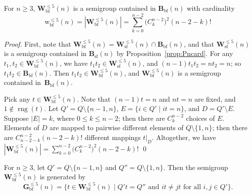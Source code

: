 \documentclass{llncs}
\renewcommand{\le}{\leqslant}
\renewcommand{\ge}{\geqslant}
\newcommand{\txt}[1]{\mbox{ #1 }}
\newcommand{\timg}{\mathop{\mbox{rng}}}
\newcommand{\Bsf}{\mathbf{B}_{\mathrm{sf}}}
\newcommand{\Bbf}{\mathbf{B}_{\mathrm{bf}}}
\newcommand{\Vsf}{\mathbf{W}^{\le 5}_{\mathrm{sf}}}
\newcommand{\Vbf}{\mathbf{W}^{\le 5}_{\mathrm{bf}}}
\newcommand{\Gbf}{\mathbf{G}^{\le 5}_{\mathrm{bf}}}
\newcommand{\vbf}{{\mathrm{w}^{\le 5}_{\mathrm{bf}}}}
\begin{document}
\begin{proposition}\label{prop:Vncard}
For $n \ge 3$, $\Vbf(n)$ is a semigroup contained in $\Bbf(n)$ with cardinality
\begin{equation*}
\vbf(n) = |\Vbf(n)| = \sum_{k=0}^{n-2} \big( C^{n-2}_k \big)^2 (n-2-k)!
\end{equation*}
\end{proposition}


\begin{proof}
First, note that $\Vbf(n) = \Vsf(n) \cap \Bbf(n)$, and that $\Vsf(n)$ is a semigroup contained in $\Bsf(n)$ by Proposition~\ref{prop:Pncard}. For any $t_1,t_2 \in \Vbf(n)$, we have $t_1t_2 \in \Vsf(n)$, and $(n-1)t_1t_2 = nt_2 = n$; so $t_1t_2 \in \Bbf(n)$. Then $t_1t_2 \in \Vbf(n)$, and $\Vbf(n)$ is a semigroup contained in~$\Bbf(n)$. 

Pick any $t \in \Vbf(n)$. Note that $(n-1)t = n$ and $nt = n$ are fixed, and $1 \not\in \timg(t)$. Let $Q' = Q \setminus \{n-1,n\}$, $E = \{i \in Q' \mid it = n\}$, and $D = Q' \setminus E$. Suppose $|E| = k$, where $0 \leq k \leq n-2$; then there are ${C^{n-2}_k}$ choices of $E$. Elements of $D$ are mapped to pairwise different elements of $Q \setminus \{1,n\}$; then there are ${C^{n-2}_{n-2-k}}(n-2-k)!$ different mappings $t|_D$. Altogether, we have
$  |\Vbf(n)| = \sum_{k=0}^{n-2} \big( C^{n-2}_k \big)^2 (n-2-k)! $ \qed
\end{proof}

\begin{proposition}\label{prop:bfgen}
For $n \ge 3$, let $Q' = Q \setminus \{n-1, n\}$ and $Q'' = Q \setminus \{1,n\}$. Then the semigroup $\Vbf(n)$ is 
generated by
$$\Gbf(n) = \{t \in \Vbf(n) \mid Q't = Q'' \txt{and} it \neq jt \txt{for all} i,j \in Q'\}.$$
\end{proposition}
\end{document}
